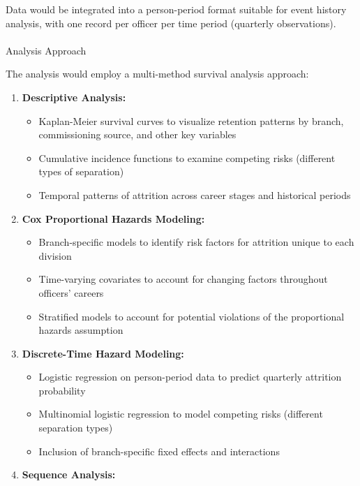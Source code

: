\documentclass[
  letterpaper,
  DIV=11,
  numbers=noendperiod]{scrartcl}
\makeatletter
\let\oldparagraph\paragraph
\renewcommand{\paragraph}{
    \@ifstar
      \xxxParagraphStar
      \xxxParagraphNoStar
  }
\newcommand{\xxxParagraphStar}[1]{\oldparagraph*{#1}\mbox{}}
\newcommand{\xxxParagraphNoStar}[1]{\oldparagraph{#1}\mbox{}}
\providecommand{\tightlist}{%
  \setlength{\itemsep}{0pt}\setlength{\parskip}{0pt}}
\makeatother
\begin{document}
Data would be integrated into a person-period format suitable for event
history analysis, with one record per officer per time period (quarterly
observations).

\paragraph{Analysis Approach}\label{analysis-approach}

The analysis would employ a multi-method survival analysis approach:

\begin{enumerate}
\def\labelenumi{\arabic{enumi}.}
\tightlist
\item
  \textbf{Descriptive Analysis:}

  \begin{itemize}
  \tightlist
  \item
    Kaplan-Meier survival curves to visualize retention patterns by
    branch, commissioning source, and other key variables
  \item
    Cumulative incidence functions to examine competing risks (different
    types of separation)
  \item
    Temporal patterns of attrition across career stages and historical
    periods
  \end{itemize}
\item
  \textbf{Cox Proportional Hazards Modeling:}

  \begin{itemize}
  \tightlist
  \item
    Branch-specific models to identify risk factors for attrition unique
    to each division
  \item
    Time-varying covariates to account for changing factors throughout
    officers' careers
  \item
    Stratified models to account for potential violations of the
    proportional hazards assumption
  \end{itemize}
\item
  \textbf{Discrete-Time Hazard Modeling:}

  \begin{itemize}
  \tightlist
  \item
    Logistic regression on person-period data to predict quarterly
    attrition probability
  \item
    Multinomial logistic regression to model competing risks (different
    separation types)
  \item
    Inclusion of branch-specific fixed effects and interactions
  \end{itemize}
\item
  \textbf{Sequence Analysis:}


\end{enumerate}
\end{document}
